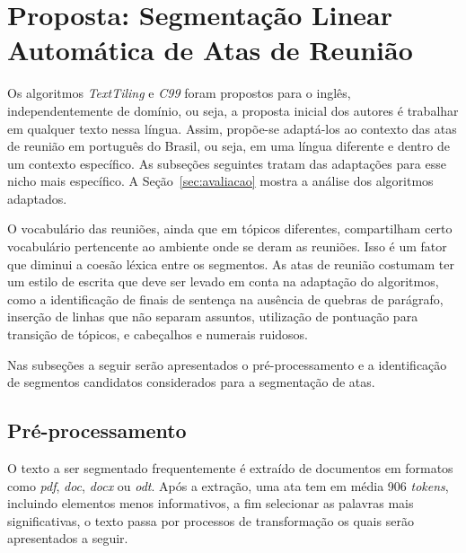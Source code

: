 \section{Proposta: Segmentação Linear Automática de Atas de Reunião}
	\label{sec:proposta}






Os algoritmos \textit{TextTiling} e \textit{C99} foram propostos para o inglês, independentemente de domínio, ou seja, a proposta inicial dos autores é trabalhar em qualquer texto nessa língua.
Assim, propõe-se adaptá-los ao contexto das atas de reunião em português do Brasil, ou seja, em uma língua diferente e dentro de um contexto específico. As subseções seguintes tratam das adaptações para esse nicho mais específico. A Seção~\ref{sec:avaliacao} mostra a análise dos algoritmos adaptados.

O vocabulário das reuniões, ainda que em tópicos diferentes, compartilham certo vocabulário pertencente ao ambiente onde se deram as reuniões. Isso é um fator que diminui a coesão léxica entre os segmentos.
As atas de reunião costumam ter um estilo de escrita que deve ser levado em conta na adaptação do algoritmos, como a identificação de finais de sentença na ausência de quebras de parágrafo, inserção de linhas que não separam assuntos, utilização de pontuação para transição de tópicos, e cabeçalhos e numerais ruidosos. 

Nas subseções a seguir serão apresentados o pré-processamento e a identificação de segmentos candidatos considerados para a segmentação de atas.





\subsection{Pré-processamento}
	\label{subsec:preprocessamento}

	O texto a ser segmentado frequentemente é extraído de documentos em formatos como \textit{pdf}, \textit{doc}, \textit{docx} ou \textit{odt}. Após a extração, uma ata tem em média 906 \textit{tokens}, incluindo elementos menos informativos, a fim selecionar as palavras mais significativas, o texto passa por processos de transformação os quais serão apresentados a seguir.
	

